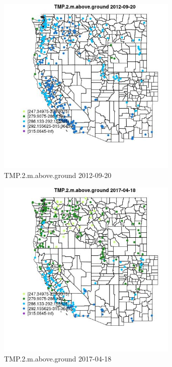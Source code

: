 \begin{figure} 
\centering  
\includegraphics[width=0.77\textwidth]{Code_Outputs/Report_ML_input_PM25_Step4_part_e_de_duplicated_aves_compiled_2019-05-14wNAs_MapObsTMP2maboveground2012-09-20.jpg} 
\caption{\label{fig:Report_ML_input_PM25_Step4_part_e_de_duplicated_aves_compiled_2019-05-14wNAsMapObsTMP2maboveground2012-09-20}TMP.2.m.above.ground 2012-09-20} 
\end{figure} 
 

\begin{figure} 
\centering  
\includegraphics[width=0.77\textwidth]{Code_Outputs/Report_ML_input_PM25_Step4_part_e_de_duplicated_aves_compiled_2019-05-14wNAs_MapObsTMP2maboveground2017-04-18.jpg} 
\caption{\label{fig:Report_ML_input_PM25_Step4_part_e_de_duplicated_aves_compiled_2019-05-14wNAsMapObsTMP2maboveground2017-04-18}TMP.2.m.above.ground 2017-04-18} 
\end{figure} 
 

